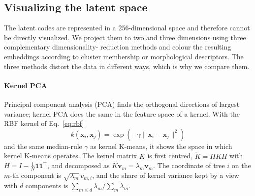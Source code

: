 
\subsection{Visualizing the latent space}  %
\label{sec:clust_projections}            %

The latent codes are represented in a 256-dimensional space and therefore cannot be directly
visualized. We project them to two and three dimensions using three complementary dimensionality-
reduction methods and colour the resulting embeddings according to cluster membership or
morphological descriptors.
The three methods distort the data in different ways, which is why we compare them.

\paragraph{Kernel PCA}                   %
Principal component analysis (PCA) finds the orthogonal directions of largest variance; kernel PCA
\cite{scholkopf1998kpca} does the same in the feature space of a kernel. With the RBF kernel of
Eq.~\eqref{eq:rbf}
\begin{equation}
  k(\mathbf{x}_i,\mathbf{x}_j) = \exp\!\left(-\gamma \|\mathbf{x}_i-\mathbf{x}_j\|^2\right)
  \label{eq:rbf}
\end{equation}
and the same median-rule $\gamma$ as kernel K-means, it shows the space in
which kernel K-means operates. The kernel matrix $K$ is first centred,
$\tilde{K} = H K H$ with $H = I - \frac{1}{N}\mathbf{1}\mathbf{1}^{\top}$, and decomposed as
$\tilde{K}\mathbf{v}_m = \lambda_m \mathbf{v}_m$. The coordinate of tree $i$ on the $m$-th
component is $\sqrt{\lambda_m}\, v_{m,i}$, and the share of kernel variance kept by a view with
$d$ components is $\sum_{m \le d} \lambda_m / \sum_m \lambda_m$. 

